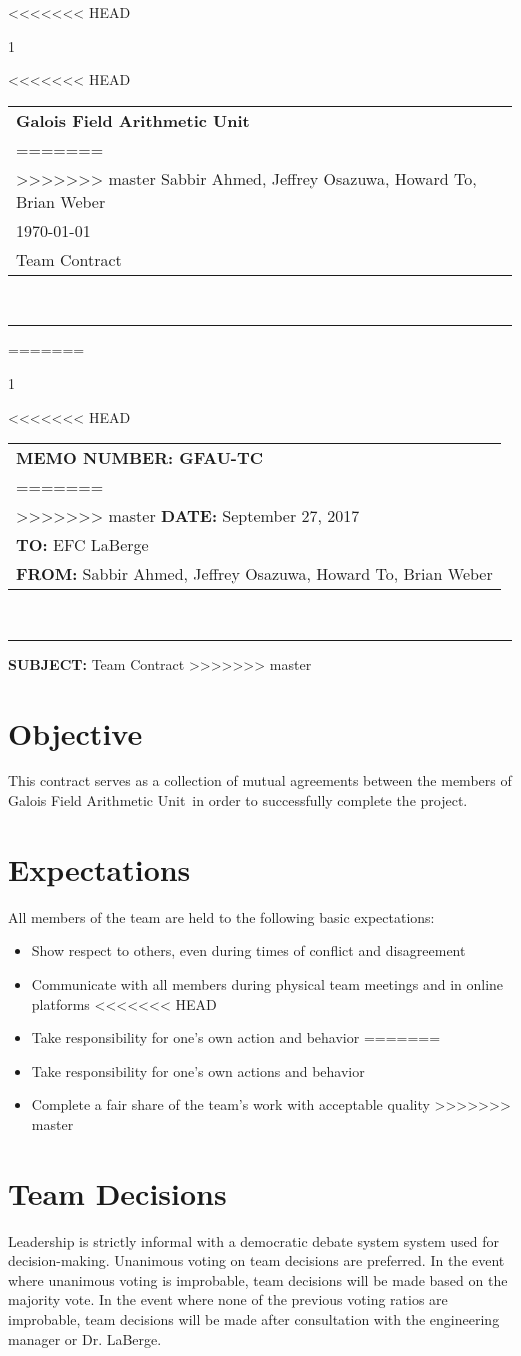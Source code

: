 \documentclass[paper=usletter, fontsize=12pt]{article}
\newcommand{\team}{Galois Field Arithmetic Unit}
\newcommand{\Sabbir}{Sabbir Ahmed}
\newcommand{\Jeffrey}{Jeffrey Osazuwa}
\newcommand{\Howard}{Howard To}
\newcommand{\Brian}{Brian Weber}
\newcommand{\documentinfo}[4]{
    \begin{centering}
        \parbox{2in}{
        \begin{spacing}{1}
            \begin{flushleft}
<<<<<<< HEAD
                \begin{tabular}{l}
                    \large\textbf{#1} \\
=======
                \begin{tabular}{l l}
                    #1 \\
>>>>>>> master
                    #2 \\
                    #3 \\
                    #4 \\
                \end{tabular}\\
                \rule{\textwidth}{1pt}
            \end{flushleft}
        \end{spacing}
        }
    \end{centering}
}
\begin{document}
<<<<<<< HEAD
    \documentinfo{\team~}{\Sabbir, \Jeffrey, \Howard, \Brian}{\today}{Team Contract}
    \vspace{-0.3in}
=======
\documentinfo{\textbf{MEMO NUMBER:} GFAU-TC}{\textbf{DATE:}  {September 27, 2017}}{\textbf{TO: } EFC LaBerge}{\textbf{FROM: }\Sabbir, \Jeffrey, \Howard, \Brian}{\textbf{SUBJECT: } Team Contract}
>>>>>>> master

    \vspace{-0.3in}
    \section{Objective}

        This contract serves as a collection of mutual agreements between the members of \team \ in order to successfully complete the project.

    \section{Expectations}

        All members of the team are held to the following basic expectations:

        \begin{itemize}

            \item Show respect to others, even during times of conflict and disagreement
            \item Communicate with all members during physical team meetings and in online platforms
<<<<<<< HEAD
            \item Take responsibility for one’s own action and behavior
=======
            \item Take responsibility for one’s own actions and behavior
		\item Complete a fair share of the team's work with acceptable quality
>>>>>>> master

        \end{itemize}

    \section{Team Decisions}

        Leadership is strictly informal with a democratic debate system system used for decision-making. Unanimous voting on team decisions are preferred. In the event where unanimous voting is improbable, team decisions will be made based on the majority vote. In the event where none of the previous voting ratios are improbable, team decisions will be made after consultation with the engineering manager or Dr. LaBerge. 
\end{document}
